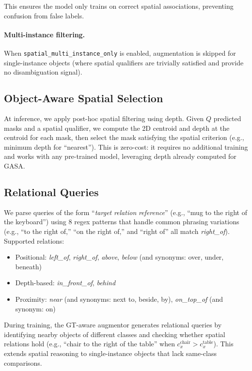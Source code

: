 This ensures the model only trains on correct spatial associations, preventing confusion from false labels.

\paragraph{Multi-instance filtering.}
When \texttt{spatial\_multi\_instance\_only} is enabled, augmentation is skipped for single-instance objects (where spatial qualifiers are trivially satisfied and provide no disambiguation signal).

\subsection{Object-Aware Spatial Selection}
\label{app:spatial_objaware}

At inference, we apply post-hoc spatial filtering using depth. Given $Q$ predicted masks and a spatial qualifier, we compute the 2D centroid and depth at the centroid for each mask, then select the mask satisfying the spatial criterion (e.g., minimum depth for ``nearest''). This is zero-cost: it requires no additional training and works with any pre-trained model, leveraging depth already computed for GASA.

\subsection{Relational Queries}

We parse queries of the form ``\textit{target} \textit{relation} \textit{reference}'' (e.g., ``mug to the right of the keyboard'') using 8 regex patterns that handle common phrasing variations (e.g., ``to the right of,'' ``on the right of,'' and ``right of'' all match \textit{right\_of}). Supported relations:
\begin{itemize}[nosep,leftmargin=*]
    \item Positional: \textit{left\_of}, \textit{right\_of}, \textit{above}, \textit{below} (and synonyms: over, under, beneath)
    \item Depth-based: \textit{in\_front\_of}, \textit{behind}
    \item Proximity: \textit{near} (and synonyms: next to, beside, by), \textit{on\_top\_of} (and synonym: on)
\end{itemize}

During training, the GT-aware augmentor generates relational queries by identifying nearby objects of different classes and checking whether spatial relations hold (e.g., ``chair to the right of the table'' when $c_x^{\text{chair}} > c_x^{\text{table}}$). This extends spatial reasoning to single-instance objects that lack same-class comparisons.

